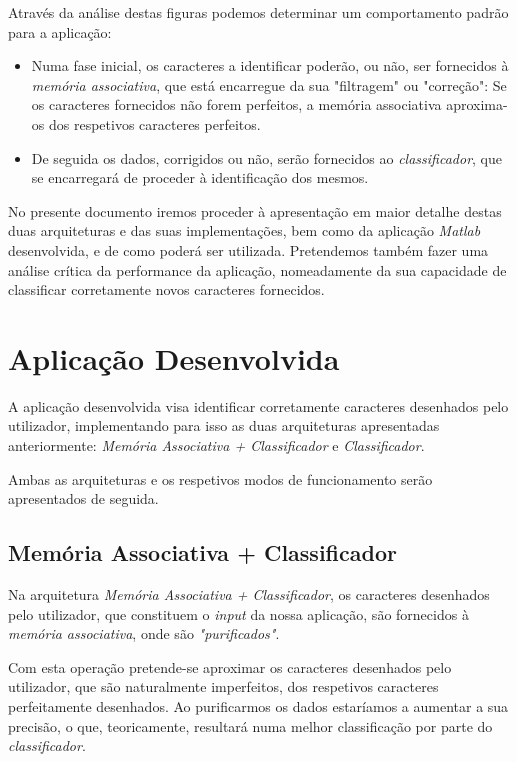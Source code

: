\documentclass{article}
\begin{document}
Através da análise destas figuras podemos determinar um comportamento padrão para a aplicação:

\begin{itemize}
\item Numa fase inicial, os caracteres a identificar poderão, ou não, ser fornecidos à \emph{memória associativa}, que está encarregue da sua "filtragem" ou "correção": Se os caracteres fornecidos não forem perfeitos, a memória associativa aproxima-os dos respetivos caracteres perfeitos.

\item De seguida os dados, corrigidos ou não, serão fornecidos ao \emph{classificador}, que se encarregará de proceder à identificação dos mesmos.
\end{itemize}

No presente documento iremos proceder à apresentação em maior detalhe destas duas arquiteturas e das suas implementações, bem como da aplicação \emph{Matlab} desenvolvida, e de como poderá ser utilizada. Pretendemos também fazer uma análise crítica da performance da aplicação, nomeadamente da sua capacidade de classificar corretamente novos caracteres fornecidos.

\pagebreak

\section{Aplicação Desenvolvida}

A aplicação desenvolvida visa identificar corretamente caracteres desenhados pelo utilizador, implementando para isso as duas arquiteturas apresentadas anteriormente: \emph{Memória Associativa + Classificador} e \emph{Classificador}.

Ambas as arquiteturas e os respetivos modos de funcionamento serão apresentados de seguida.

\subsection{Memória Associativa + Classificador}

Na arquitetura \emph{Memória Associativa + Classificador}, os caracteres desenhados pelo utilizador, que constituem o \emph{input} da nossa aplicação, são fornecidos à \emph{memória associativa}, onde são \emph{"purificados"}.

Com esta operação pretende-se aproximar os caracteres desenhados pelo utilizador, que são naturalmente imperfeitos, dos respetivos caracteres perfeitamente desenhados. Ao purificarmos os dados estaríamos a aumentar a sua precisão, o que, teoricamente, resultará numa melhor classificação por parte do \emph{classificador}.
\end{document}
